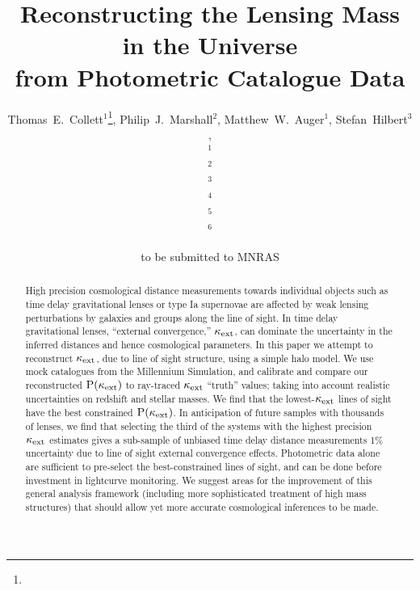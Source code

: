 \documentclass[useAMS,usenatbib,a4paper]{mn2e}
\title[Line of Sight Mass Reconstruction]
{Reconstructing the Lensing Mass in the Universe \\
from Photometric Catalogue Data}
\author[Collett \etal]{%
  Thomas~E.~Collett$^{1}$\thanks{\collettemail},
  Philip~J.~Marshall$^{2}$,
  Matthew~W.~Auger$^{1}$,
  Stefan~Hilbert$^{3}$,
\newauthor{%
  Sherry~H.~Suyu$^{4,3}$,
  Zachary~Greene$^{4}$,
  Tommaso~Treu$^{4}$\thanks{\packard},
  Christopher~D.~Fassnacht$^{5}$,}
\newauthor{%
  L\'eon~V.~E.~Koopmans$^{6}$,
  Maru\v{s}a Brada\v{c}$^{5}$,
  Roger~D.~Blandford$^{3}$} 
  \medskip\\
  $^1$\ioa\\
  $^2$\oxford\\
  $^3$\kipac\\
  $^4$\ucsb\\
  $^5$\davis\\
  $^6$\kapteyn
}
\begin{document}
             
\date{to be submitted to MNRAS}
\pagerange{\pageref{firstpage}--\pageref{lastpage}}

\maketitle           

\label{firstpage}


\begin{abstract} 

High precision cosmological distance measurements towards individual objects
such as time delay gravitational lenses or type Ia supernovae are affected by
weak lensing perturbations by galaxies and groups along the line of sight. In
time delay gravitational lenses, ``external convergence,'' $\kappa_{\rm ext}$, can
dominate the uncertainty in the inferred distances and hence cosmological parameters.
 In this paper we attempt
to reconstruct $\kappa_{\rm ext}$, due to line of sight structure, using a simple halo
model.
%
We use mock catalogues from the Millennium Simulation, and calibrate and 
compare our reconstructed ${\rm P}(\kappa_{\rm ext})$ to ray-traced $\kappa_{\rm ext}$ ``truth''
values; taking into account realistic uncertainties on redshift and stellar
masses.  
%
We find that the lowest-$\kappa_{\rm ext}$ lines of sight have the best constrained 
${\rm P}(\kappa_{\rm ext})$. In anticipation of future samples with thousands of lenses,
we find that selecting the third of the systems with the
highest precision $\kappa_{\rm ext}$ estimates gives a  sub-sample of unbiased time
delay distance measurements  1\% uncertainty due
to line of sight external convergence effects. Photometric data alone are
sufficient to pre-select the best-constrained lines of sight, and can be done
before investment in lightcurve monitoring. 
%
  We suggest areas for the
improvement of this general analysis framework (including more sophisticated
treatment of high mass structures) that should allow yet more accurate
cosmological inferences to be made.

\end{abstract}
\end{document}
